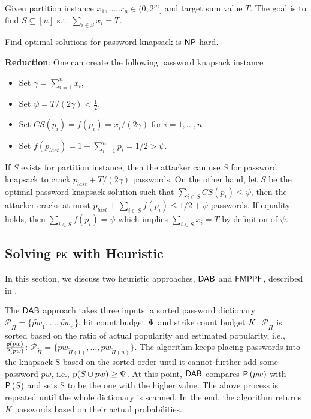 \begin{definition}
	Given partition instance $x_1,\ldots,x_{n} \in (0,2^m]$ and target sum value $T$. The  goal is to find $S \subseteq [n]$ s.t. $\sum_{i\in S} x_i = T$.
\end{definition}

\begin{thm}\label{appendix:ProofOfPasswordKnapsack}
	Find optimal solutions for password knapsack is $\mathsf{NP}$-hard.
\end{thm}

\textbf{Reduction}: One can create the following password knapsack instance 
\begin{itemize}
	\item Set $\gamma = \sum_{i=1}^n x_i$,
	\item Set $\psi = T/(2\gamma )< \frac{1}{2}$,
	\item Set $CS(p_i)= f(p_{i}) = x_i/(2\gamma)$ for $i=1,\ldots, n$
	\item Set $f(p_{last}) = 1-\sum_{i =1}^{n} p_i = 1/2 > \psi$. 
\end{itemize}
If $S$ exists for partition instance, then the attacker can use $S$ for password knapsack to crack $p_{last}+T/(2\gamma)$ passwords. On the other hand, let $S$ be the optimal password knapsack solution such that $\sum_{i \in S} CS(p_i) \leq \psi$, then the attacker cracks at most $p_{last}+\sum_{i \in S} f(p_i) \leq 1/2 + \psi$ passwords. If equality holds, then $\sum_{i \in S} f(p_i) = \psi$ which implies $\sum_{i \in S} x_i = T$ by definition of $\psi$.





\subsection{Solving $\mathsf{PK}$ with Heuristic}\label{appendix:solvePK}
In this section, we discuss two heuristic approaches, $\mathsf{DAB}$ and $\mathsf{FMPPF}$, described in .  

The $\mathsf{DAB}$ approach takes three inputs: a sorted password dictionary $\mathcal{P}_{\tilde{\Pi}} = \{\tilde{pw}_1, \ldots, \tilde{pw}_{n} \}$, hit count budget $\Psi$ and strike count budget $K$. $\mathcal{P}_{\tilde{\Pi}}$ is sorted based on the ratio of actual popularity and estimated popularity, i.e., $\frac{\textsf{p}(pw)}{\mathsf{P}\left(pw\right)}$: $\mathcal{P}_{\tilde{\Pi}} = \{pw_{\tilde{\Pi}(1)}, \ldots, pw_{\tilde{\Pi}(n)} \}$. The algorithm keeps placing passwords into the knapsack S based on the sorted order until it cannot further add some password $pw$, i.e., $\textsf{p}(S \cup pw) \ge \Psi$. At this point, $\mathsf{DAB}$ compares $\mathsf{P}\left(pw\right)$ with $\mathsf{P}\left(S\right)$ and sets S to be the one with the higher value. The above process is repeated until the whole dictionary is scanned. In the end, the algorithm returns $K$ passwords based on their actual probabilities.

